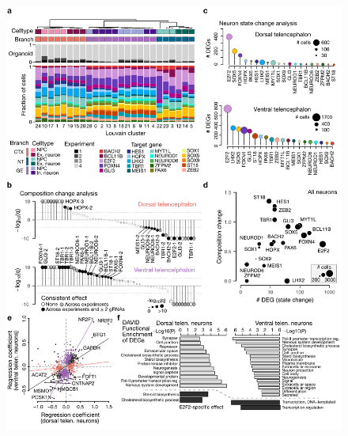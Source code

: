 \begin{figure}[h!]
    \centering
	\includegraphics[width=\textwidth]{figures/pando/Figure_S8}
    \label{fig:regS8}
\end{figure}

